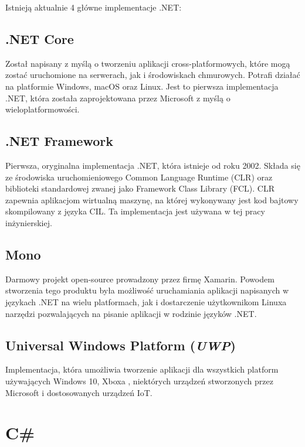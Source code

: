 Istnieją aktualnie 4 główne implementacje .NET:

\subsection{.NET Core}
Został napisany z myślą o tworzeniu aplikacji cross-platformowych, które mogą zostać uruchomione na serwerach, jak i środowiskach chmurowych. Potrafi działać na platformie Windows, macOS oraz Linux. Jest to pierwsza implementacja .NET, która została zaprojektowana przez Microsoft z myślą o wieloplatformowości.

\subsection{.NET Framework}
Pierwsza, oryginalna implementacja .NET, która istnieje od roku 2002. Składa się ze środowiska uruchomieniowego Common Language Runtime (CLR) oraz biblioteki standardowej zwanej jako Framework Class Library (FCL). CLR zapewnia aplikacjom wirtualną maszynę, na której wykonywany jest kod bajtowy skompilowany z języka CIL. Ta implementacja jest używana w tej pracy inżynierskiej.

\subsection{Mono}
Darmowy projekt open-source prowadzony przez firmę Xamarin. Powodem stworzenia tego produktu była możliwość uruchamiania aplikacji napisanych w językach .NET na wielu platformach, jak i dostarczenie użytkownikom Linuxa narzędzi pozwalających na pisanie aplikacji w rodzinie języków .NET.
\subsection{Universal Windows Platform (\textit{UWP})}
Implementacja, która umożliwia tworzenie aplikacji dla wszystkich platform używających Windows 10, Xboxa , niektórych urządzeń stworzonych przez Microsoft i dostosowanych urządzeń IoT.


\section{C\#}

